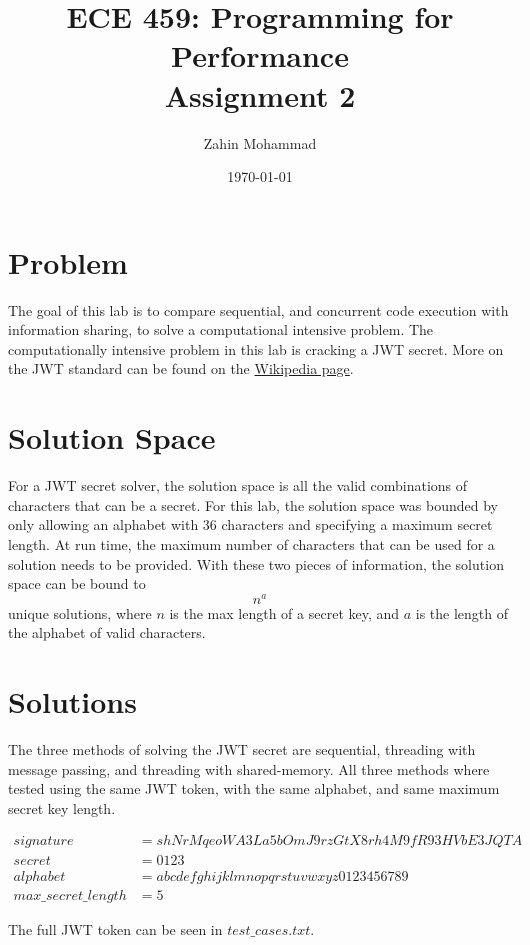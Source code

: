 \documentclass[12pt]{article}
\title{ECE 459: Programming for Performance\\Assignment 2}
\author{Zahin Mohammad}
\date{\today}
\begin{document}
\maketitle

\section{Problem}
The goal of this lab is to compare sequential, and concurrent code execution with information sharing, to solve a computational intensive problem. The computationally intensive problem in this lab is cracking a JWT secret. More on the JWT standard can be found on the 
\href{https://en.wikipedia.org/wiki/JSON_Web_Token}{Wikipedia page}.
\section{Solution Space}
For a JWT secret solver, the solution space is all the valid combinations of characters that can be a secret. For this lab, the solution space was bounded by only allowing an alphabet with 36 characters and specifying a maximum secret length. At run time, the maximum number of characters that can be used for a solution needs to be provided. With these two pieces of information, the solution space can be bound to
\begin{equation}
    n^{a}
\end{equation}
unique solutions, where $n$ is the max length of a secret key, and $a$ is the length of the alphabet of valid characters.

\section{Solutions}
The three methods of solving the JWT secret are sequential, threading with message passing, and threading with shared-memory. All three methods where tested using the same JWT token, with the same alphabet, and same maximum secret key length.

\begin{align*}
    signature &= shNrMqeoWA3La5bOmJ9rzGtX8rh4M9fR93HVbE3JQTA \\ 
    secret &= 0123 \\
    alphabet &= abcdefghijklmnopqrstuvwxyz0123456789 \\ 
    max\_secret\_length &= 5
\end{align*}

The full JWT token can be seen in \textit{$test\_cases.txt$}.
\end{document}
